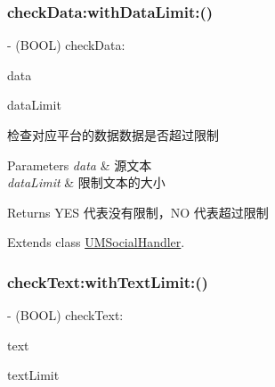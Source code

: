 \subsubsection{\texorpdfstring{check\+Data\+:with\+Data\+Limit\+:()}{checkData:withDataLimit:()}\hspace{0.1cm}{\footnotesize\ttfamily [2/2]}}
{\footnotesize\ttfamily -\/ (B\+O\+OL) check\+Data\+: \begin{DoxyParamCaption}\item[{(N\+S\+Data $\ast$)}]{data }\item[{withDataLimit:(N\+S\+U\+Integer)}]{data\+Limit }\end{DoxyParamCaption}}

检查对应平台的数据数据是否超过限制


\begin{DoxyParams}{Parameters}
{\em data} & 源文本 \\
\hline
{\em data\+Limit} & 限制文本的大小\\
\hline
\end{DoxyParams}
\begin{DoxyReturn}{Returns}
Y\+ES 代表没有限制，\+NO 代表超过限制 
\end{DoxyReturn}


Extends class \mbox{\hyperlink{interface_u_m_social_handler_aa40a617ff5de296f940d1bb9de9ca9d6}{U\+M\+Social\+Handler}}.

\mbox{\label{category_u_m_social_handler_07_u_m_social_limit_08_a50a70e47f3feb853f947b55aebf3dde2}} 
\subsubsection{\texorpdfstring{check\+Text\+:with\+Text\+Limit\+:()}{checkText:withTextLimit:()}\hspace{0.1cm}{\footnotesize\ttfamily [1/2]}}
{\footnotesize\ttfamily -\/ (B\+O\+OL) check\+Text\+: \begin{DoxyParamCaption}\item[{(N\+S\+String $\ast$)}]{text }\item[{withTextLimit:(N\+S\+U\+Integer)}]{text\+Limit }\end{DoxyParamCaption}}

